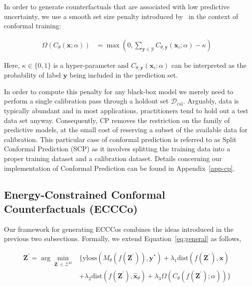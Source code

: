 \documentclass{article}
\begin{document}
In order to generate counterfactuals that are associated with low predictive uncertainty, we use a smooth set size penalty introduced by~\citet{stutz2022learning} in the context of conformal training:

\begin{equation}\label{eq:setsize}
  \begin{aligned}
    \Omega(C_{\theta}(\mathbf{x};\alpha))&=\max \left(0, \sum_{\mathbf{y}\in\mathcal{Y}}C_{\theta,\mathbf{y}}(\mathbf{x}_i;\alpha) - \kappa \right)
  \end{aligned}
\end{equation}

Here, $\kappa \in \{0,1\}$ is a hyper-parameter and $C_{\theta,\mathbf{y}}(\mathbf{x}_i;\alpha)$ can be interpreted as the probability of label $\mathbf{y}$ being included in the prediction set. 

In order to compute this penalty for any black-box model we merely need to perform a single calibration pass through a holdout set $\mathcal{D}_{\text{cal}}$. Arguably, data is typically abundant and in most applications, practitioners tend to hold out a test data set anyway. Consequently, CP removes the restriction on the family of predictive models, at the small cost of reserving a subset of the available data for calibration. This particular case of conformal prediction is referred to as Split Conformal Prediction (SCP) as it involves splitting the training data into a proper training dataset and a calibration dataset. Details concerning our implementation of Conformal Prediction can be found in Appendix~\ref{app-cp}.

\subsection{Energy-Constrained Conformal Counterfactuals (ECCCo)}

Our framework for generating ECCCos combines the ideas introduced in the previous two subsections. Formally, we extend Equation~\ref{eq:general} as follows,

\begin{equation} \label{eq:eccco}
  \begin{aligned}
  \mathbf{Z}^\prime= \arg \min_{\mathbf{Z}^\prime \in \mathcal{Z}^M}  &\{  {\text{yloss}(M_{\theta}(f(\mathbf{Z}^\prime)),\mathbf{y}^*)}+ \lambda_{1} {\text{dist}(f(\mathbf{Z}^\prime),\mathbf{x}) } \\
  &+ \lambda_2 \text{dist}(f(\mathbf{Z}^\prime),\hat{\mathbf{x}}_{\theta}) + \lambda_3 \Omega(C_{\theta}(f(\mathbf{Z}^\prime);\alpha)) \} 
  \end{aligned} 
\end{equation}
\end{document}
